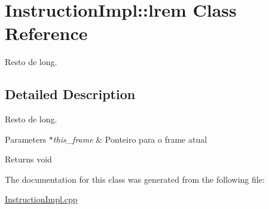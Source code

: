 \hypertarget{class_instruction_impl_1_1lrem}{}\section{Instruction\+Impl\+:\+:lrem Class Reference}
\label{class_instruction_impl_1_1lrem}


Resto de long.  




\subsection{Detailed Description}
Resto de long. 


\begin{DoxyParams}{Parameters}
{\em $\ast$this\+\_\+frame} & Ponteiro para o frame atual \\
\hline
\end{DoxyParams}
\begin{DoxyReturn}{Returns}
void 
\end{DoxyReturn}


The documentation for this class was generated from the following file\+:\begin{DoxyCompactItemize}
\item 
\hyperlink{_instruction_impl_8cpp}{Instruction\+Impl.\+cpp}\end{DoxyCompactItemize}

